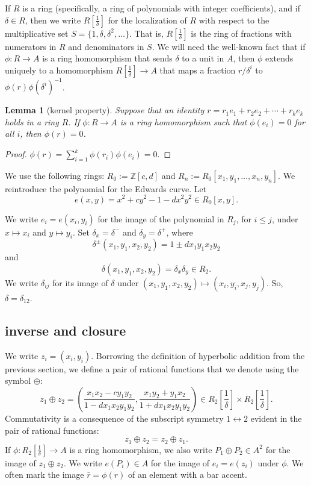 \documentclass[12pt]{article}
\newtheorem{lemma}[theorem]{Lemma}
\newcommand{\ring}[1]{\mathbb{#1}}
\newcommand{\f}[1]{\frac{1}{#1}}
\begin{document}
If $R$ is a ring (specifically, a ring of polynomials with integer
coefficients), and if $\delta\in R$, then we write $R[\f{\delta}]$ for
the localization of $R$ with respect to the multiplicative set
$S=\{1,\delta,\delta^2,\ldots\}$.  That is, $R[\f{\delta}]$ is the
ring of fractions with numerators in $R$ and denominators in $S$.  We
will need the well-known fact that if $\phi:R\to A$ is a ring
homomorphism that sends $\delta$ to a unit in $A$, then $\phi$ extends
uniquely to a homomorphism $R[\f{\delta}]\to A$ that maps a fraction
$r/\delta^i$ to $\phi(r)\phi(\delta^i)^{-1}$.

\begin{lemma}[kernel property] Suppose that an identity $r = r_1 e_1 +
  r_2 e_2 +\cdots + r_k e_k$ holds in a ring $R$.  If $\phi:R\to A$ is
  a ring homomorphism such that $\phi(e_i) =0$ for all $i$, then
  $\phi(r)=0$.
\end{lemma}

\begin{proof}
$\phi(r) = \sum_{i=1}^k \phi(r_i) \phi(e_i) = 0.$
\end{proof}

We use the following rings: $R_0 := \ring{Z}[c,d]$ and $R_n :=
R_0[x_1,y_1,\ldots,x_n,y_n]$.  We reintroduce the polynomial for the
Edwards curve.  Let
\begin{equation}
e(x,y) = x^2 + c y^2 -1 - d x^2 y^2 \in  R_0[x,y].
\end{equation}

We write $e_i = e(x_i,y_i)$ for the image of the polynomial in $R_j$,
for $i\le j$, under $x\mapsto x_i$ and $y\mapsto y_i$.  Set
$\delta_x = \delta^-$ and $\delta_y = \delta^+$, where
\[\delta^{\pm} (x_1,y_1,x_2,y_2) = 1\pm d x_1 y_1 x_2 y_2\] and
\[
\delta(x_1,y_1,x_2,y_2) = \delta_x\delta_y\in R_2.
\]
We write $\delta_{ij}$ for its image of $\delta$ under
$(x_1,y_1,x_2,y_2)\mapsto (x_i,y_i,x_j,y_j)$.  So,
$\delta=\delta_{12}$.

\subsection{inverse and closure}

We write $z_i = (x_i,y_i)$.
Borrowing the definition of hyperbolic addition from the previous
section, we define a pair of rational functions that we denote using
the symbol $\oplus$:
\begin{equation}\label{eqn:add}
z_1 \oplus z_2 =  \left(\frac{x_1 x_2 - c y_1 y_2}{1 - d x_1 x_2 y_1 y_2},
\frac{x_1 y_2 + y_1 x_2}{1+d x_1 x_2 y_1 y_2}\right) 
\in R_2[\f{\delta}]\times R_2[\f{\delta}].
\end{equation}
Commutativity is a consequence of the subscript symmetry
$1\leftrightarrow 2$ evident in the pair of rational functions:
\[
z_1 \oplus z_2 = z_2\oplus z_1.
\]
If $\phi:R_2[\f{\delta}]\to A$ is a ring homomorphism, we also write
$P_1\oplus P_2\in A^2$ for the image of $z_1\oplus z_2$.  We write
$e(P_i)\in A$ for the image of $e_i=e(z_i)$ under $\phi$.  We often
mark the image $\bar r=\phi(r)$ of an element with a bar accent.
\end{document}
